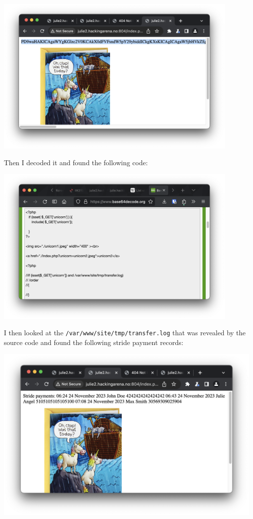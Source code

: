 \begin{center}
    \includegraphics[width=12cm]{img/Web hacking/Order a Unicorn/Screenshot 2023-11-24 at 12.54.35.png}
\end{center}

Then I decoded it and found the following code:

\begin{center}
    \includegraphics[width=12cm]{img/Web hacking/Order a Unicorn/Screenshot 2023-11-24 at 12.54.54.png}
\end{center}

I then looked at the \texttt{/var/www/site/tmp/transfer.log} that was revealed by the source code and found the following stride payment records:

\begin{center}
    \includegraphics[width=14cm]{img/Web hacking/Order a Unicorn/Screenshot 2023-11-24 at 12.55.13.png}
\end{center}

